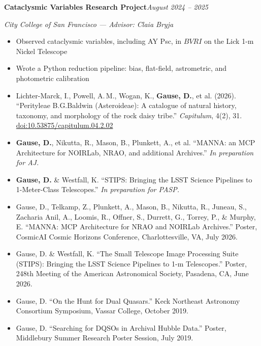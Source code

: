 \documentclass[11pt]{article}
\newcommand{\sectiontitle}[1]{\needspace{6\baselineskip}\vspace{10pt}{\textbf{\large #1}}\par\vspace{-7pt}\hrulefill\par\vspace{4pt}}
\newcommand{\entry}[3]{\textbf{#1}\hfill\textit{#2 -- #3}\par}
\newcommand{\org}[1]{\textit{#1}\par}
\newcommand{\entrygap}{\vspace{6pt}}
\begin{document}
\entrygap
\entry{Cataclysmic Variables Research Project}{August 2024}{2025}
\org{City College of San Francisco --- Advisor: Claia Bryja}
\begin{itemize}
    \item Observed cataclysmic variables, including AY Psc, in $BVRI$ on the Lick 1-m Nickel Telescope
    \item Wrote a Python reduction pipeline: bias, flat-field, astrometric, and photometric calibration
\end{itemize}

\sectiontitle{Publications}

\begin{itemize}
    \item Lichter-Marck, I., Powell, A.\,M., Wogan, K., \textbf{Gause, D.}, et al. (2026). ``Perityleae B.G.Baldwin (Asteroideae): A catalogue of natural history, taxonomy, and morphology of the rock daisy tribe.'' \textit{Capitulum}, 4(2), 31. \href{https://doi.org/10.53875/capitulum.04.2.02}{doi:10.53875/capitulum.04.2.02}
    \item \textbf{Gause, D.}, Nikutta, R., Mason, B., Plunkett, A., et al. ``MANNA: an MCP Architecture for NOIRLab, NRAO, and additional Archives.'' \textit{In preparation for AJ.}
    \item \textbf{Gause, D.} \& Westfall, K. ``STIPS: Bringing the LSST Science Pipelines to 1-Meter-Class Telescopes.'' \textit{In preparation for PASP.}
\end{itemize}

\sectiontitle{Presentations}

\begin{itemize}
    \item Gause, D., Telkamp, Z., Plunkett, A., Mason, B., Nikutta, R., Juneau, S., Zacharia Anil, A., Loomis, R., Offner, S., Durrett, G., Torrey, P., \& Murphy, E. ``MANNA: MCP Architecture for NRAO and NOIRLab Archives.'' Poster, CosmicAI Cosmic Horizons Conference, Charlottesville, VA, July 2026.
    \item Gause, D. \& Westfall, K. ``The Small Telescope Image Processing Suite (STIPS): Bringing the LSST Science Pipelines to 1-m Telescopes.'' Poster, 248th Meeting of the American Astronomical Society, Pasadena, CA, June 2026.
    \item Gause, D. ``On the Hunt for Dual Quasars.'' Keck Northeast Astronomy Consortium Symposium, Vassar College, October 2019.
    \item Gause, D. ``Searching for DQSOs in Archival Hubble Data.'' Poster, Middlebury Summer Research Poster Session, July 2019.
\end{itemize}
\end{document}
